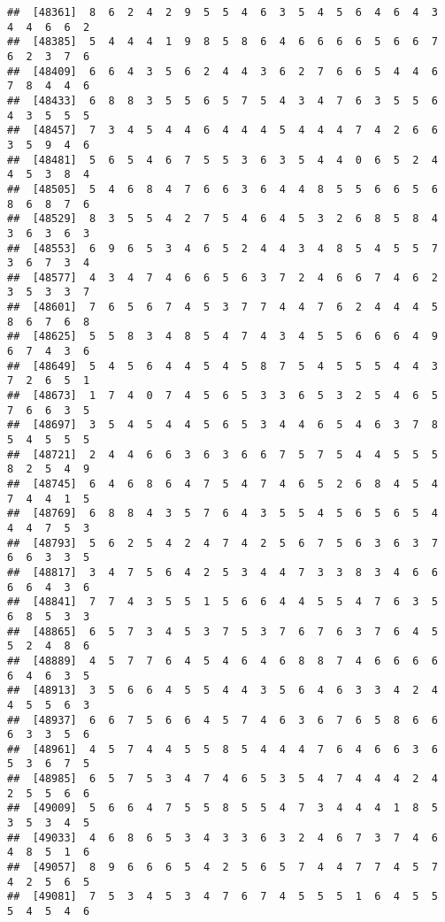 \documentclass[
]{book}
\begin{document}
\begin{verbatim}
##  [48361]  8  6  2  4  2  9  5  5  4  6  3  5  4  5  6  4  6  4  3  4  4  6  6  2
##  [48385]  5  4  4  4  1  9  8  5  8  6  4  6  6  6  6  5  6  6  7  6  2  3  7  6
##  [48409]  6  6  4  3  5  6  2  4  4  3  6  2  7  6  6  5  4  4  6  7  8  4  4  6
##  [48433]  6  8  8  3  5  5  6  5  7  5  4  3  4  7  6  3  5  5  6  4  3  5  5  5
##  [48457]  7  3  4  5  4  4  6  4  4  4  5  4  4  4  7  4  2  6  6  3  5  9  4  6
##  [48481]  5  6  5  4  6  7  5  5  3  6  3  5  4  4  0  6  5  2  4  4  5  3  8  4
##  [48505]  5  4  6  8  4  7  6  6  3  6  4  4  8  5  5  6  6  5  6  8  6  8  7  6
##  [48529]  8  3  5  5  4  2  7  5  4  6  4  5  3  2  6  8  5  8  4  3  6  3  6  3
##  [48553]  6  9  6  5  3  4  6  5  2  4  4  3  4  8  5  4  5  5  7  3  6  7  3  4
##  [48577]  4  3  4  7  4  6  6  5  6  3  7  2  4  6  6  7  4  6  2  3  5  3  3  7
##  [48601]  7  6  5  6  7  4  5  3  7  7  4  4  7  6  2  4  4  4  5  8  6  7  6  8
##  [48625]  5  5  8  3  4  8  5  4  7  4  3  4  5  5  6  6  6  4  9  6  7  4  3  6
##  [48649]  5  4  5  6  4  4  5  4  5  8  7  5  4  5  5  5  4  4  3  7  2  6  5  1
##  [48673]  1  7  4  0  7  4  5  6  5  3  3  6  5  3  2  5  4  6  5  7  6  6  3  5
##  [48697]  3  5  4  5  4  4  5  6  5  3  4  4  6  5  4  6  3  7  8  5  4  5  5  5
##  [48721]  2  4  4  6  6  3  6  3  6  6  7  5  7  5  4  4  5  5  5  8  2  5  4  9
##  [48745]  6  4  6  8  6  4  7  5  4  7  4  6  5  2  6  8  4  5  4  7  4  4  1  5
##  [48769]  6  8  8  4  3  5  7  6  4  3  5  5  4  5  6  5  6  5  4  4  4  7  5  3
##  [48793]  5  6  2  5  4  2  4  7  4  2  5  6  7  5  6  3  6  3  7  6  6  3  3  5
##  [48817]  3  4  7  5  6  4  2  5  3  4  4  7  3  3  8  3  4  6  6  6  6  4  3  6
##  [48841]  7  7  4  3  5  5  1  5  6  6  4  4  5  5  4  7  6  3  5  6  8  5  3  3
##  [48865]  6  5  7  3  4  5  3  7  5  3  7  6  7  6  3  7  6  4  5  5  2  4  8  6
##  [48889]  4  5  7  7  6  4  5  4  6  4  6  8  8  7  4  6  6  6  6  6  4  6  3  5
##  [48913]  3  5  6  6  4  5  5  4  4  3  5  6  4  6  3  3  4  2  4  4  5  5  6  3
##  [48937]  6  6  7  5  6  6  4  5  7  4  6  3  6  7  6  5  8  6  6  6  3  3  5  6
##  [48961]  4  5  7  4  4  5  5  8  5  4  4  4  7  6  4  6  6  3  6  5  3  6  7  5
##  [48985]  6  5  7  5  3  4  7  4  6  5  3  5  4  7  4  4  4  2  4  2  5  5  6  6
##  [49009]  5  6  6  4  7  5  5  8  5  5  4  7  3  4  4  4  1  8  5  3  5  3  4  5
##  [49033]  4  6  8  6  5  3  4  3  3  6  3  2  4  6  7  3  7  4  6  4  8  5  1  6
##  [49057]  8  9  6  6  6  5  4  2  5  6  5  7  4  4  7  7  4  5  7  4  2  5  6  5
##  [49081]  7  5  3  4  5  3  4  7  6  7  4  5  5  5  1  6  4  5  5  5  4  5  4  6

\end{verbatim}
\end{document}
